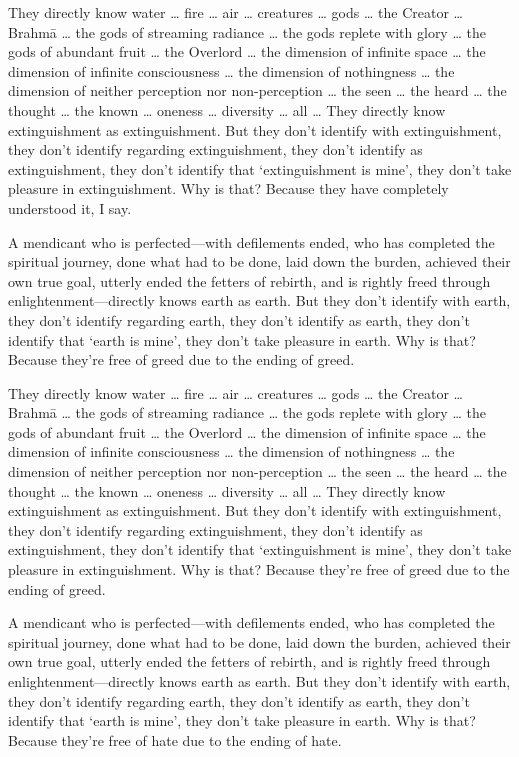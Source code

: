 \documentclass[12pt,openany]{book}%
\begin{document}
They directly know water … fire … air … creatures … gods … the Creator … \textsanskrit{Brahmā} … the gods of streaming radiance … the gods replete with glory … the gods of abundant fruit … the Overlord … the dimension of infinite space … the dimension of infinite consciousness … the dimension of nothingness … the dimension of neither perception nor non-perception … the seen … the heard … the thought … the known … oneness … diversity … all … They directly know extinguishment as extinguishment. But they don’t identify with extinguishment, they don’t identify regarding extinguishment, they don’t identify as extinguishment, they don’t identify that ‘extinguishment is mine’, they don’t take pleasure in extinguishment. Why is that? Because they have completely understood it, I say. 

A mendicant who is perfected—with defilements ended, who has completed the spiritual journey, done what had to be done, laid down the burden, achieved their own true goal, utterly ended the fetters of rebirth, and is rightly freed through enlightenment—directly knows earth as earth. But they don’t identify with earth, they don’t identify regarding earth, they don’t identify as earth, they don’t identify that ‘earth is mine’, they don’t take pleasure in earth. Why is that? Because they’re free of greed due to the ending of greed. 

They directly know water … fire … air … creatures … gods … the Creator … \textsanskrit{Brahmā} … the gods of streaming radiance … the gods replete with glory … the gods of abundant fruit … the Overlord … the dimension of infinite space … the dimension of infinite consciousness … the dimension of nothingness … the dimension of neither perception nor non-perception … the seen … the heard … the thought … the known … oneness … diversity … all … They directly know extinguishment as extinguishment. But they don’t identify with extinguishment, they don’t identify regarding extinguishment, they don’t identify as extinguishment, they don’t identify that ‘extinguishment is mine’, they don’t take pleasure in extinguishment. Why is that? Because they’re free of greed due to the ending of greed. 

A mendicant who is perfected—with defilements ended, who has completed the spiritual journey, done what had to be done, laid down the burden, achieved their own true goal, utterly ended the fetters of rebirth, and is rightly freed through enlightenment—directly knows earth as earth. But they don’t identify with earth, they don’t identify regarding earth, they don’t identify as earth, they don’t identify that ‘earth is mine’, they don’t take pleasure in earth. Why is that? Because they’re free of hate due to the ending of hate. 
\end{document}
